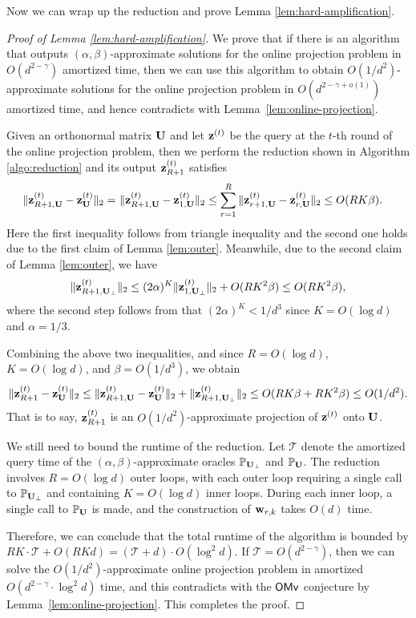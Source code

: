 Now we can wrap up the reduction and prove Lemma \ref{lem:hard-amplification}.
\begin{proof}[Proof of Lemma \ref{lem:hard-amplification}]
We prove that if there is an algorithm that outputs $(\alpha, \beta)$-approximate solutions for the online projection problem in $O(d^{2-\gamma})$ amortized time, then we can use this algorithm to obtain $O(1/d^2)$-approximate solutions for the online projection problem in $O(d^{2-\gamma + o(1)})$ amortized time, and hence contradicts with Lemma~\ref{lem:online-projection}.

Given an orthonormal matrix $\mathbf{U}$ and let $\mathbf{z}^{(t)}$ be the query at the $t$-th round of the online projection problem, then we perform the reduction shown in Algorithm \ref{algo:reduction} and its output $\mathbf{z}^{(t)}_{R+1}$ satisfies
\begin{align*}
\|\mathbf{z}_{R+1, \mathbf{U}}^{(t)} - \mathbf{z}_{\mathbf{U}}^{(t)}\|_2 = &~ \|\mathbf{z}_{R+1, \mathbf{U}}^{(t)} - \mathbf{z}_{1, \mathbf{U}}^{(t)}\|_2 \leq \sum_{r=1}^{R} \|\mathbf{z}_{r+1, \mathbf{U}}^{(t)} - \mathbf{z}_{r, \mathbf{U}}^{(t)}\|_2 \leq O(RK\beta).
\end{align*}
Here the first inequality follows from triangle inequality and the second one holds due to the first claim of Lemma \ref{lem:outer}.
Meanwhile, due to the second claim of Lemma \ref{lem:outer}, we have
\begin{align*}
\|\mathbf{z}_{R+1, \mathbf{U}_\perp}^{(t)}\|_2 \leq (2\alpha)^{K}\|\mathbf{z}_{1, \mathbf{U}_\perp}^{(t)}\|_2 + O(RK^2\beta) \leq O(RK^2\beta),
\end{align*}
where the second step follows from that $(2 \alpha)^K < 1/d^3$ since $K = O(\log d)$ and $\alpha = 1/3$.

Combining the above two inequalities, and since $R = O(\log d)$, $K = O(\log d)$, and $\beta = O(1/d^3)$, we obtain
\begin{align*}
\|\mathbf{z}_{R+1}^{(t)} - \mathbf{z}_{\mathbf{U}}^{(t)}\|_2 \leq \|\mathbf{z}_{R+1, \mathbf{U}}^{(t)} - \mathbf{z}_{\mathbf{U}}^{(t)}\|_2 + \|\mathbf{z}_{R+1, \mathbf{U}_\perp}^{(t)}\|_2 \leq O(RK\beta  + RK^2\beta) \leq O(1/d^2).
\end{align*}
That is to say, $\mathbf{z}_{R+1}^{(t)}$ is an $O(1/d^2)$-approximate projection of $\mathbf{z}^{(t)}$ onto $\mathbf{U}$.


We still need to bound the runtime of the reduction. Let $\mathcal{T}$ denote the amortized query time of the $(\alpha, \beta)$-approximate oracles $\mathbb{P}_{\mathbf{U}_\perp}$ and $\mathbb{P}_{\mathbf{U}}$. The reduction involves $R = O(\log d)$ outer loops, with each outer loop requiring a single call to $\mathbb{P}_{\mathbf{U}_\perp}$ and containing $K = O(\log d)$ inner loops. During each inner loop, a single call to $\mathbb{P}_{\mathbf{U}}$ is made, and the construction of $\mathbf{w}_{r,k}$ takes $O(d)$ time.

Therefore, we can conclude that the total runtime of the algorithm is bounded by $RK \cdot \mathcal{T} + O(RKd) = (\mathcal{T} + d) \cdot O(\log^2 d)$. If $\mathcal{T} = O(d^{2-\gamma})$, then we can solve the $O(1/d^2)$-approximate online projection problem in amortized $O(d^{2-\gamma} \cdot \log^2 d)$ time, and this contradicts with the $\mathsf{OMv}$ conjecture by Lemma~\ref{lem:online-projection}. This completes the proof.
\end{proof}




